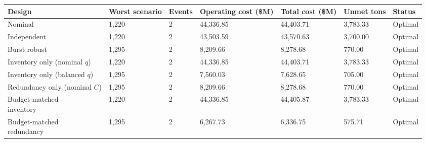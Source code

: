 \begin{tabular}{lllllll}
\toprule
Design & Worst scenario & Events & Operating cost (\$M) & Total cost (\$M) & Unmet tons & Status \\
\midrule
Nominal & 1,220 & 2 & 44,336.85 & 44,403.71 & 3,783.33 & Optimal \\
Independent & 1,220 & 2 & 43,503.59 & 43,570.63 & 3,700.00 & Optimal \\
Burst robust & 1,295 & 2 & 8,209.66 & 8,278.68 & 770.00 & Optimal \\
\shortstack[l]{Inventory only\\(nominal $q$)} & 1,220 & 2 & 44,336.85 & 44,403.71 & 3,783.33 & Optimal \\
\shortstack[l]{Inventory only\\(balanced $q$)} & 1,295 & 2 & 7,560.03 & 7,628.65 & 705.00 & Optimal \\
\shortstack[l]{Redundancy only\\(nominal $C$)} & 1,295 & 2 & 8,209.66 & 8,278.68 & 770.00 & Optimal \\
\shortstack[l]{Budget-matched\\inventory} & 1,220 & 2 & 44,336.85 & 44,405.87 & 3,783.33 & Optimal \\
\shortstack[l]{Budget-matched\\redundancy} & 1,295 & 2 & 6,267.73 & 6,336.75 & 575.71 & Optimal \\
\bottomrule
\end{tabular}
